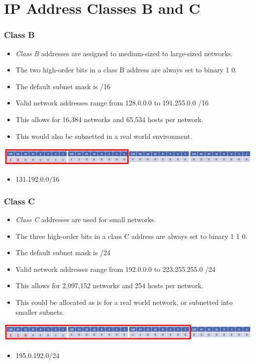 \documentclass[pdflatex,compress]{beamer}
\begin{document}
\section{IP Address Classes B and C}

\begin{frame}
	\frametitle{Class B}
	\begin{itemize}
		\item \textit{Class B} addresses are assigned to medium-sized to large-sized networks.
		\item The two high-order bits in a class B address are always set to binary 1 0.
		\item The default subnet mask is /16
		\item Valid network addresses range from 128.0.0.0 to 191.255.0.0 /16
		\item This allows for 16,384 networks and 65,534 hosts per network.
		\item This would also be subnetted in a real world environment.
	\end{itemize}
	
	\begin{center}
		\includegraphics[width=1\linewidth]{img/img05}
	\end{center}
	\begin{itemize}
		\item 131.192.0.0/16
	\end{itemize}
\end{frame}

\begin{frame}
	\frametitle{Class C}
	\begin{itemize}
		\item \textit{Class C} addresses are used for small networks.
		\item The three high-order bits in a class C address are always set to binary 1 1 0.
		\item The default subnet mask is /24
		\item Valid network addresses range from 192.0.0.0 to 223.255.255.0 /24
		\item This allows for 2,097,152 networks and 254 hosts per network.
		\item This could be allocated as is for a real world network, or subnetted into smaller subnets.
	\end{itemize}
	
	\begin{center}
		\includegraphics[width=1\linewidth]{img/img06}
	\end{center}

	\begin{itemize}
		\item 195.0.192.0/24
	\end{itemize}
\end{frame}
\end{document}
